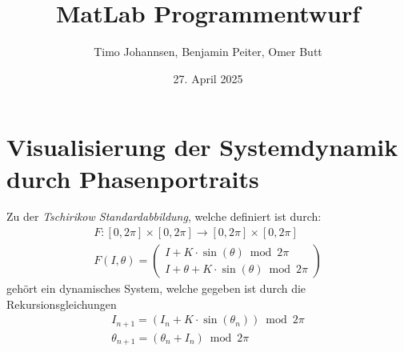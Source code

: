 \documentclass[paper=a4, 
                DIV=12]{scrartcl}
\title{MatLab Programmentwurf}
\author{Timo Johannsen, Benjamin Peiter, Omer Butt}
\date{27. April 2025}
\begin{document}
\maketitle
\newpage
\tableofcontents
\newpage

\section{Visualisierung der Systemdynamik durch Phasenportraits}
Zu der \textit{Tschirikow Standardabbildung}, welche definiert ist durch:
\begin{gather*}
    F: [0,2\pi] \times [0,2\pi] \to [0,2\pi] \times [0,2\pi] \\
    F(I, \theta) = 
    \begin{pmatrix}
        I + K \cdot \sin(\theta) \bmod 2\pi \\
        I + \theta + K \cdot \sin(\theta) \bmod 2\pi
    \end{pmatrix}
\end{gather*}
gehört ein dynamisches System, welche gegeben ist durch die Rekursionsgleichungen
\begin{gather*}
    I_{n+1} = (I_n + K \cdot \sin(\theta_n)) \bmod 2\pi \\
    \theta_{n+1} = (\theta_n + I_n) \bmod 2\pi
\end{gather*}
\end{document}
